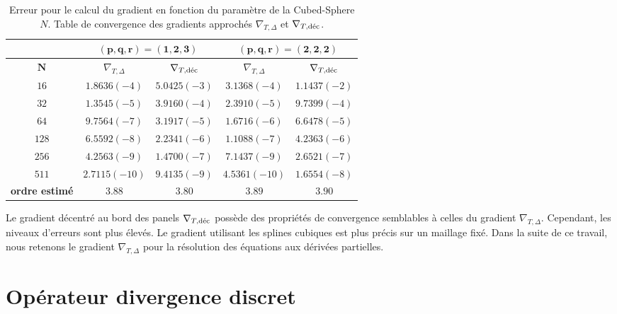 \begin{table}[htbp]
\begin{center}
\begin{tabular}{|c||c|c||c|c|}
\hline
  & \multicolumn{2}{c||}{$\mathbf{(p,q,r)=(1,2,3)}$} & \multicolumn{2}{c|}{$\mathbf{(p,q,r)=(2,2,2)}$} \\
\hline
$\mathbf{N}$    &  $\nabla_{T,\Delta}$  & $\nabla_{T,\dec}$  &  $\nabla_{T,\Delta}$  & $\nabla_{T,\dec}$     \\
\hline
\hline
$16$   & $1.8636 (-4)$ & $5.0425 (-3)$ & $3.1368 (-4)$ & $1.1437 (-2)$ \\
$32$   & $1.3545 (-5)$ & $3.9160 (-4)$ & $2.3910 (-5)$ & $9.7399 (-4)$ \\
$64$   & $9.7564 (-7)$ & $3.1917 (-5)$ & $1.6716 (-6)$ & $6.6478 (-5)$ \\
$128$  & $6.5592 (-8)$ & $2.2341 (-6)$ & $1.1088 (-7)$ & $4.2363 (-6)$ \\
$256$  & $4.2563 (-9)$ & $1.4700 (-7)$ & $7.1437 (-9)$ & $2.6521 (-7)$ \\
$511$  & $2.7115(-10)$ & $9.4135 (-9)$ & $4.5361(-10)$ & $1.6554 (-8)$ \\
\hline
\hline
\textbf{ordre estimé} & $3.88$ & $3.80$ & $3.89$ & $3.90$\\
\hline 
\end{tabular}
\end{center}
\caption{Erreur pour le calcul du gradient en fonction du paramètre de la Cubed-Sphere $N$. Table de convergence des gradients approchés $\nabla_{T,\Delta}$ et $\nabla_{T,\dec}$.}
\label{tab:rate_grad3}
\end{table}

Le gradient décentré au bord des panels $\nabla_{T,\dec}$ possède des propriétés de convergence semblables à celles du gradient $\nabla_{T,\Delta}$. Cependant, les niveaux d'erreurs sont plus élevés. Le gradient utilisant les splines cubiques est plus précis sur un maillage fixé. Dans la suite de ce travail, nous retenons le gradient $\nabla_{T,\Delta}$ pour la résolution des équations aux dérivées partielles.





















\section{Opérateur divergence discret}

